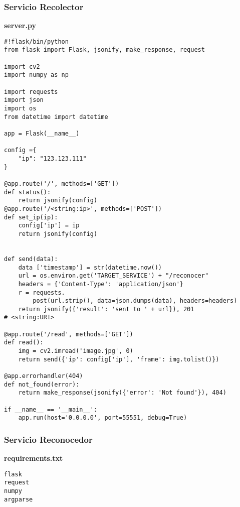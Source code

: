 \subsubsection{Servicio Recolector}
{\sffamily \textbf{server.py}}
\begin{mdframed}[linecolor=black, topline=true, bottomline=true,
  leftline=false, rightline=false, backgroundcolor=LightGray,userdefinedwidth=\textwidth]
\begin{verbatim}
#!flask/bin/python
from flask import Flask, jsonify, make_response, request

import cv2
import numpy as np

import requests
import json
import os
from datetime import datetime

app = Flask(__name__)

config ={
    "ip": "123.123.111"    
}

@app.route('/', methods=['GET'])
def status():
    return jsonify(config)
@app.route('/<string:ip>', methods=['POST'])
def set_ip(ip):
    config['ip'] = ip
    return jsonify(config)


def send(data):
    data ['timestamp'] = str(datetime.now())
    url = os.environ.get('TARGET_SERVICE') + "/reconocer"
    headers = {'Content-Type': 'application/json'}
    r = requests.
        post(url.strip(), data=json.dumps(data), headers=headers)
    return jsonify({'result': 'sent to ' + url}), 201
# <string:URI>

@app.route('/read', methods=['GET'])
def read():
    img = cv2.imread('image.jpg', 0)
    return send({'ip': config['ip'], 'frame': img.tolist()})

@app.errorhandler(404)
def not_found(error):
    return make_response(jsonify({'error': 'Not found'}), 404)

if __name__ == '__main__':
    app.run(host='0.0.0.0', port=55551, debug=True)

\end{verbatim}
\end{mdframed}

\subsubsection{Servicio Reconocedor}
{\sffamily \textbf{requirements.txt}}
\begin{mdframed}[linecolor=black, topline=true, bottomline=true,
  leftline=false, rightline=false, backgroundcolor=LightGray,userdefinedwidth=\textwidth]
\begin{verbatim}
flask
request
numpy
argparse
\end{verbatim}
\end{mdframed}


